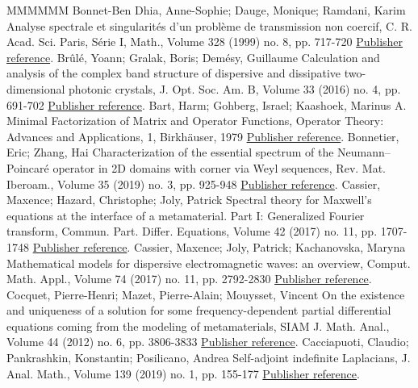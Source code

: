 \begin{thebibliography}{MMMMMM}
 Bonnet-Ben Dhia, Anne-Sophie; Dauge, Monique; Ramdani, Karim Analyse spectrale et singularités d’un problème de transmission non coercif, C. R. Acad. Sci. Paris, Série I, Math., Volume 328 (1999) no. 8, pp. 717-720 \href{https://ahl.centre-mersenne.org/item/AHL_2020__3__1161_0/#Bon-Dau-Ram-99}{Publisher reference}.
 Brûlé, Yoann; Gralak, Boris; Demésy, Guillaume Calculation and analysis of the complex band structure of dispersive and dissipative two-dimensional photonic crystals, J. Opt. Soc. Am. B, Volume 33 (2016) no. 4, pp. 691-702 \href{https://ahl.centre-mersenne.org/item/AHL_2020__3__1161_0/#Bru-Gra-Dem-16}{Publisher reference}.
 Bart, Harm; Gohberg, Israel; Kaashoek, Marinus A. Minimal Factorization of Matrix and Operator Functions, Operator Theory: Advances and Applications, 1, Birkhäuser, 1979 \href{https://ahl.centre-mersenne.org/item/AHL_2020__3__1161_0/#Bar-Goh-Kaa-79}{Publisher reference}.
 Bonnetier, Eric; Zhang, Hai Characterization of the essential spectrum of the Neumann–Poincaré operator in 2D domains with corner via Weyl sequences, Rev. Mat. Iberoam., Volume 35 (2019) no. 3, pp. 925-948 \href{https://ahl.centre-mersenne.org/item/AHL_2020__3__1161_0/#Bon-Zha-17}{Publisher reference}.
 Cassier, Maxence; Hazard, Christophe; Joly, Patrick Spectral theory for Maxwell’s equations at the interface of a metamaterial. Part I: Generalized Fourier transform, Commun. Part. Differ. Equations, Volume 42 (2017) no. 11, pp. 1707-1748 \href{https://ahl.centre-mersenne.org/item/AHL_2020__3__1161_0/#Cas-Haz-Jol}{Publisher reference}.
 Cassier, Maxence; Joly, Patrick; Kachanovska, Maryna Mathematical models for dispersive electromagnetic waves: an overview, Comput. Math. Appl., Volume 74 (2017) no. 11, pp. 2792-2830 \href{https://ahl.centre-mersenne.org/item/AHL_2020__3__1161_0/#Cas-Jol-Kac}{Publisher reference}.
 Cocquet, Pierre-Henri; Mazet, Pierre-Alain; Mouysset, Vincent On the existence and uniqueness of a solution for some frequency-dependent partial differential equations coming from the modeling of metamaterials, SIAM J. Math. Anal., Volume 44 (2012) no. 6, pp. 3806-3833 \href{https://ahl.centre-mersenne.org/item/AHL_2020__3__1161_0/#Coc-Maz-Mou-12}{Publisher reference}.
 Cacciapuoti, Claudio; Pankrashkin, Konstantin; Posilicano, Andrea Self-adjoint indefinite Laplacians, J. Anal. Math., Volume 139 (2019) no. 1, pp. 155-177 \href{https://ahl.centre-mersenne.org/item/AHL_2020__3__1161_0/#Cac-Pan-Pos}{Publisher reference}.

\end{thebibliography}
